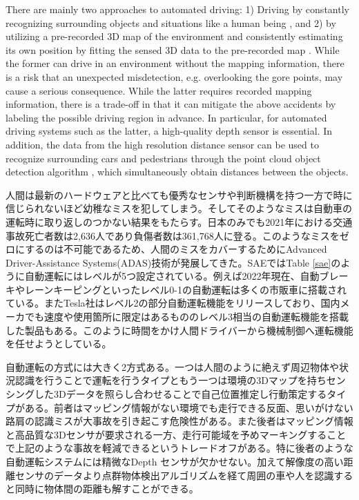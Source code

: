 \documentclass[letterpaper, 10 pt, conference]{ieeeconf}  %
\begin{document}
There are mainly two approaches to automated driving: 1) Driving by constantly recognizing surrounding objects and situations like a human being \cite{tesla}, and 2) by utilizing a pre-recorded 3D map of the environment and consistently estimating its own position by fitting the sensed 3D data to the pre-recorded map \cite{montemerlo2008junior}.  While the former can drive in an environment without the mapping information, there is a risk that an unexpected misdetection, e.g. overlooking the gore points, may cause a serious consequence. While the latter requires recorded mapping information, there is a trade-off in that it can mitigate the above accidents by labeling the possible driving 
region in advance. In particular, for automated driving systems such as the latter, a high-quality depth sensor is essential. In addition, the data from the high resolution distance sensor can be used to recognize surrounding cars and pedestrians through the point cloud object detection algorithm \cite{lang2019pointpillars, qi2018frustum}, which simultaneously obtain distances between the objects.

人間は最新のハードウェアと比べても優秀なセンサや判断機構を持つ一方で時に信じられないほど幼稚なミスを犯してしまう。そしてそのようなミスは自動車の運転時に取り返しのつかない結果をもたらす。日本のみでも2021年における交通事故死亡者数は2,636人であり負傷者数は361,768人に登る\cite{keisatsu}。このようなミスをゼロにするのは不可能であるため、人間のミスをカバーするためにAdvanced Driver-Assistance Systems(ADAS)技術が発展してきた。SAEではTable \ref{sae}のように自動運転にはレベルが5つ設定されている\cite{sae}。例えば2022年現在、自動ブレーキやレーンキーピングといったレベル0-1の自動運転は多くの市販車に搭載されている。またTesla社はレベル2の部分自動運転機能をリリースしており、\cite{tesla}国内メーカでも速度や使用箇所に限定はあるもののレベル3相当の自動運転機能を搭載した製品もある\cite{honda}。このように時間をかけ人間ドライバーから機械制御へ運転機能を任せようとしている。

自動運転の方式には大きく2方式ある。一つは人間のように絶えず周辺物体や状況認識を行うことで運転を行うタイプ\cite{tesla}ともう一つは環境の3Dマップを持ちセンシングした3Dデータを照らし合わせることで自己位置推定し行動策定するタイプがある\cite{montemerlo2008junior}。前者はマッピング情報がない環境でも走行できる反面、思いがけない路肩の認識ミスが大事故を引き起こす危険性がある。また後者はマッピング情報と高品質な3Dセンサが要求される一方、走行可能域を予めマーキングすることで上記のような事故を軽減できるというトレードオフがある。特に後者のような自動運転システムには精微なDepth センサが欠かせない。加えて解像度の高い距離センサのデータより点群物体検出アルゴリズム\cite{lang2019pointpillars, qi2018frustum}を経て周囲の車や人を認識すると同時に物体間の距離も解すことができる。
\end{document}
